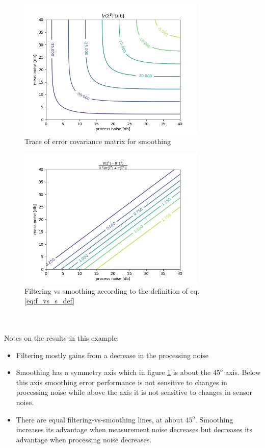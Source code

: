 \documentclass[oneside,12pt]{article}
\begin{document}
%
%
\begin{figure}
    \centering
        \includegraphics[width=0.8\textwidth]{./Smoothing_meas_a}
        \caption{\label{fig:Smoothing_meas_a}Trace of error covariance matrix for smoothing}
\end{figure}
%
%
\begin{figure}
    \centering
        \includegraphics[width=0.8\textwidth]{./Filtering_vs_Smoothing_meas_a}
        \caption{\label{fig:Filtering_vs_Smoothing_meas_a}Filtering vs smoothing according to the definition of eq. \ref{eq:f_vs_s_def}}
\end{figure}
%
\\\\Notes on the results in this example:
\begin{itemize}
    \item Filtering mostly gains from a decrease in the processing noise
    \item Smoothing has a symmetry axis which in figure \ref{fig:Smoothing_meas_a} is about the $45^o$ axis. Below this axis smoothing error performance is not sensitive to changes in processing noise while above the axis it is not sensitive to changes in sensor noise. 
    \item There are equal filtering-vs-smoothing lines, at about $45^o$. Smoothing increases its advantage when measurement noise decreases but decreases its advantage when processing noise decreases. 
\end{itemize}
\end{document}
